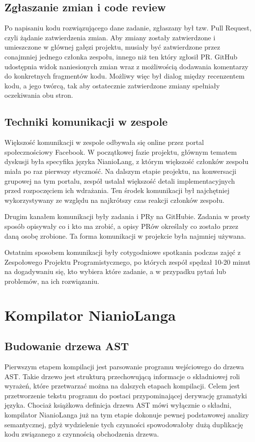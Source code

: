 \documentclass[licencjacka]{pracamgr}
\begin{document}
\section{Zgłaszanie zmian i code review}
Po napisaniu kodu rozwiązującego dane zadanie, zgłaszany był tzw. Pull Request,
czyli żądanie zatwierdzenia zmian. Aby zmiany zostały zatwierdzone i umieszczone
w głównej gałęzi projektu, musiały być zatwierdzone przez conajmniej jednego członka
zespołu, innego niż ten który zgłosił PR. GitHub udostępnia widok naniesionych zmian
wraz z możliwością dodawania komentarzy do konkretnych fragmentów kodu. Możliwy więc
był dialog między recenzentem kodu, a jego twórcą, tak aby ostatecznie zatwierdzone
zmiany spełniały oczekiwania obu stron.

\section{Techniki komunikacji w zespole}
Większość komunikacji w zespole odbywała się online przez portal społecznościowy Facebook.
W początkowej fazie projektu, głównym tematem dyskusji była specyfika języka NianioLang,
z którym większość członków zespołu miała po raz pierwszy styczność.
Na dalszym etapie projektu, na konwersacji grupowej na tym portalu, zespół
ustalał większość detali implementacyjnych przed rozpoczęciem ich wdrażania.
Ten środek komunikacji był najchętniej wykorzystywany ze względu na najkrótszy czas
reakcji członków zespołu.

Drugim kanałem komunikacji były zadania i PRy na GitHubie. Zadania w prosty sposób
opisywały co i kto ma zrobić, a opisy PRów określały co zostało przez daną osobę zrobione.
Ta forma komunikacji w projekcie była najmniej używana.

Ostatnim sposobem komunikacji były cotygodniowe spotkania podczas zajęć z Zespołowego
Projektu Programistycznego, po których zespół spędzał 10-20 minut na dogadywaniu się,
kto wybiera które zadanie, a w przypadku pytań lub problemów, na ich rozwiązaniu.

\chapter{Kompilator NianioLanga}
\label{sec:compiler}
\section{Budowanie drzewa AST}
Pierwszym etapem kompilacji jest parsowanie programu wejściowego do drzewa AST. Takie drzewo jest strukturą przechowującą informacje o składniowej
roli wyrażeń, które przetwarzać można na dalszych etapach kompilacji. Celem jest przetworzenie tekstu programu do postaci przypominającej derywację
gramatyki języka. Chociaż książkowa definicja drzewa AST mówi wyłącznie o składni, kompilator NianioLanga już na tym etapie dokonuje pewnej
podstawowej analizy semantycznej, gdyż wydzielenie tych czynności spowodowałoby dużą duplikację kodu związanego z czynnością obchodzenia drzewa.
\end{document}
